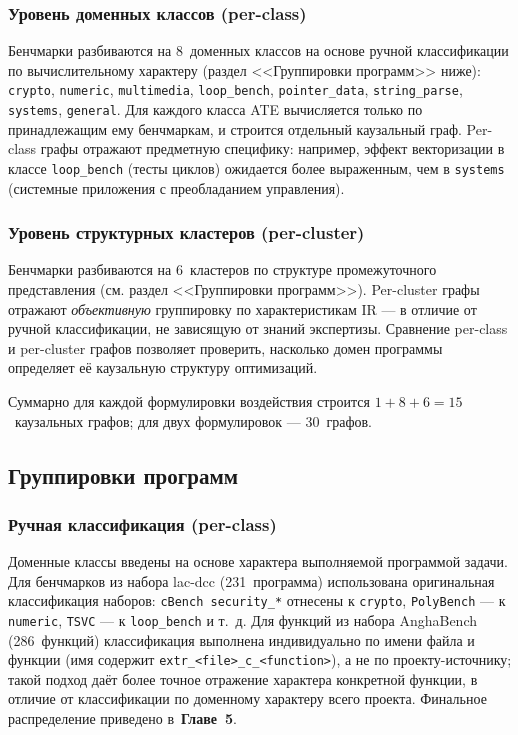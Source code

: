 \subsubsection{Уровень доменных классов (per-class)}

Бенчмарки разбиваются на 8~доменных классов на основе ручной классификации по вычислительному характеру (раздел <<Группировки программ>> ниже): \texttt{crypto}, \texttt{numeric}, \texttt{multimedia}, \texttt{loop\_bench}, \texttt{pointer\_data}, \texttt{string\_parse}, \texttt{systems}, \texttt{general}. Для каждого класса ATE вычисляется только по принадлежащим ему бенчмаркам, и строится отдельный каузальный граф. Per-class графы отражают предметную специфику: например, эффект векторизации в классе \texttt{loop\_bench} (тесты циклов) ожидается более выраженным, чем в \texttt{systems} (системные приложения с преобладанием управления).

\subsubsection{Уровень структурных кластеров (per-cluster)}

Бенчмарки разбиваются на 6~кластеров по структуре промежуточного представления (см. раздел <<Группировки программ>>). Per-cluster графы отражают \emph{объективную} группировку по характеристикам IR --- в отличие от ручной классификации, не зависящую от знаний экспертизы. Сравнение per-class и per-cluster графов позволяет проверить, насколько домен программы определяет её каузальную структуру оптимизаций.

\medskip

Суммарно для каждой формулировки воздействия строится $1 + 8 + 6 = 15$~каузальных графов; для двух формулировок --- 30~графов.

\subsection{Группировки программ}

\subsubsection{Ручная классификация (per-class)}

Доменные классы введены на основе характера выполняемой программой задачи. Для бенчмарков из набора lac-dcc (231~программа) использована оригинальная классификация наборов: \texttt{cBench security\_*} отнесены к \texttt{crypto}, \texttt{PolyBench} --- к \texttt{numeric}, \texttt{TSVC} --- к \texttt{loop\_bench} и т.~д. Для функций из набора AnghaBench (286~функций) классификация выполнена индивидуально по имени файла и функции (имя содержит \texttt{extr\_<file>\_c\_<function>}), а не по проекту-источнику; такой подход даёт более точное отражение характера конкретной функции, в отличие от классификации по доменному характеру всего проекта. Финальное распределение приведено в~\textbf{Главе~5}.

